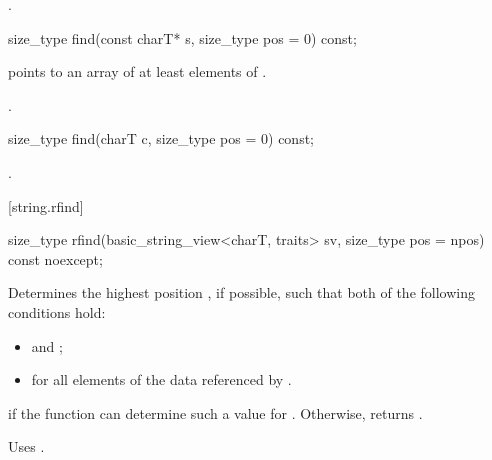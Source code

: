 \begin{itemdescr}
\pnum
\returns
{}.
\end{itemdescr}

%
\begin{itemdecl}
size_type find(const charT* s, size_type pos = 0) const;
\end{itemdecl}

\begin{itemdescr}
\pnum
\requires {} points to an array of at least 
elements of .

\pnum
\returns
{}.
\end{itemdescr}

%
\begin{itemdecl}
size_type find(charT c, size_type pos = 0) const;
\end{itemdecl}

\begin{itemdescr}
\pnum
\returns
{}.
\end{itemdescr}

[string.rfind]{}

%
\begin{itemdecl}
size_type rfind(basic_string_view<charT, traits> sv, size_type pos = npos) const noexcept;
\end{itemdecl}

\begin{itemdescr}
\pnum
\effects
Determines the highest position , if possible, such that both of
the following conditions hold:
\begin{itemize}
\item
{}
and
;
\item
{}%
for all elements  of the data referenced by .
\end{itemize}

\pnum
\returns
{} if the function can determine such a value for .
Otherwise, returns
.

\pnum
\remarks
Uses
.
\end{itemdescr}


